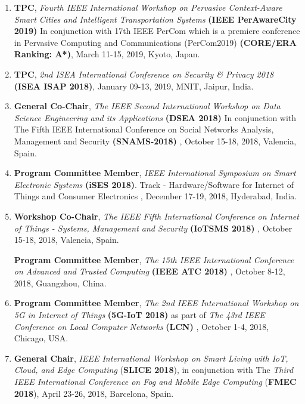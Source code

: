 
\begin{enumerate} %

\item
\textbf{TPC}, \textit{Fourth IEEE International Workshop on Pervasive Context-Aware Smart Cities and Intelligent Transportation Systems} \textbf{(IEEE PerAwareCity 2019)} In conjunction with 17th IEEE PerCom which is a premiere conference in Pervasive Computing and Communications (PerCom2019) \textbf{(CORE/ERA Ranking: A*)}, March 11-15, 2019, Kyoto, Japan.

\item
\textbf{TPC}, \textit{2nd ISEA International Conference on Security \& Privacy 2018} \textbf{(ISEA ISAP 2018)}, January 09-13, 2019, MNIT, Jaipur, India.

\item
\textbf{General Co-Chair}, \textit{The IEEE Second International Workshop on Data Science Engineering and its Applications} \textbf{(DSEA 2018)} In conjunction with 
The Fifth IEEE International Conference on Social Networks Analysis, Management and Security \textbf{(SNAMS-2018) }, October 15-18, 2018, Valencia, Spain.

\item
\textbf{Program Committee Member}, \textit{IEEE International Symposium on Smart Electronic Systems} \textbf{(iSES 2018)}. Track - Hardware/Software for Internet of Things and Consumer Electronics , December 17-19, 2018, Hyderabad, India.

\item
\textbf{Workshop Co-Chair}, \textit{The IEEE Fifth International Conference on Internet of Things - Systems, Management and Security} \textbf{(IoTSMS 2018)} , October 15-18, 2018, Valencia, Spain.

\textbf{Program Committee Member}, \textit{The 15th IEEE International Conference on Advanced and Trusted Computing} \textbf{(IEEE ATC 2018)} , October 8-12, 2018, Guangzhou, China. %

\item
\textbf{Program Committee Member}, \textit{The 2nd IEEE International Workshop on 5G in Internet of Things} \textbf{(5G-IoT 2018)} as part of \textit{The 43rd IEEE Conference on Local Computer Networks} \textbf{(LCN)} , October 1-4, 2018, Chicago, USA. %

\item
\textbf{General Chair}, \textit{IEEE International Workshop on Smart Living with IoT, Cloud, and Edge Computing }(\textbf{SLICE 2018}), in conjunction with The \textit{Third IEEE International Conference on Fog and Mobile Edge Computing} (\textbf{FMEC 2018}), April 23-26, 2018, Barcelona, Spain.


\end{enumerate}
